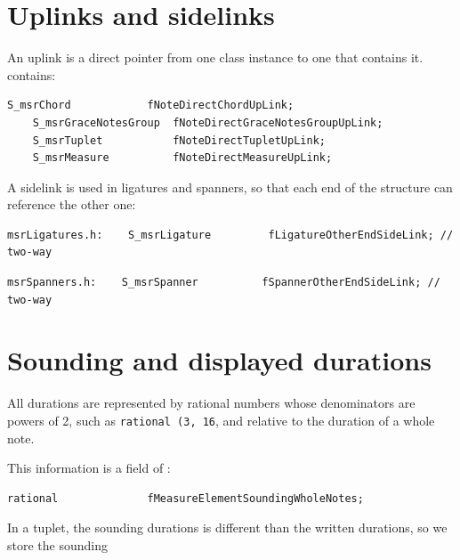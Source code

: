 \section{Uplinks and sidelinks}\label{Uplinks and sidelinks}

An uplink is a direct pointer from one class instance to one that contains it.  contains:
\begin{lstlisting}[language=CPlusPlus]
    S_msrChord            fNoteDirectChordUpLink;
    S_msrGraceNotesGroup  fNoteDirectGraceNotesGroupUpLink;
    S_msrTuplet           fNoteDirectTupletUpLink;
    S_msrMeasure          fNoteDirectMeasureUpLink;
\end{lstlisting}

A sidelink is used in ligatures and spanners, so that each end of the structure can reference the other one:
\begin{lstlisting}[language=CPlusPlus]
msrLigatures.h:    S_msrLigature         fLigatureOtherEndSideLink; // two-way
\end{lstlisting}

\begin{lstlisting}[language=CPlusPlus]
msrSpanners.h:    S_msrSpanner          fSpannerOtherEndSideLink; // two-way
\end{lstlisting}


\section{Sounding and displayed durations}\label{Sounding and displayed durations}

All durations are represented by rational numbers whose denominators are powers of 2, such as {\tt rational (3, 16}, and relative to the duration of a whole note.

This information is a field of :
\begin{lstlisting}[language=CPlusPlus]
    rational              fMeasureElementSoundingWholeNotes;
\end{lstlisting}

In a tuplet, the sounding durations is different than the written durations, so we store the sounding

